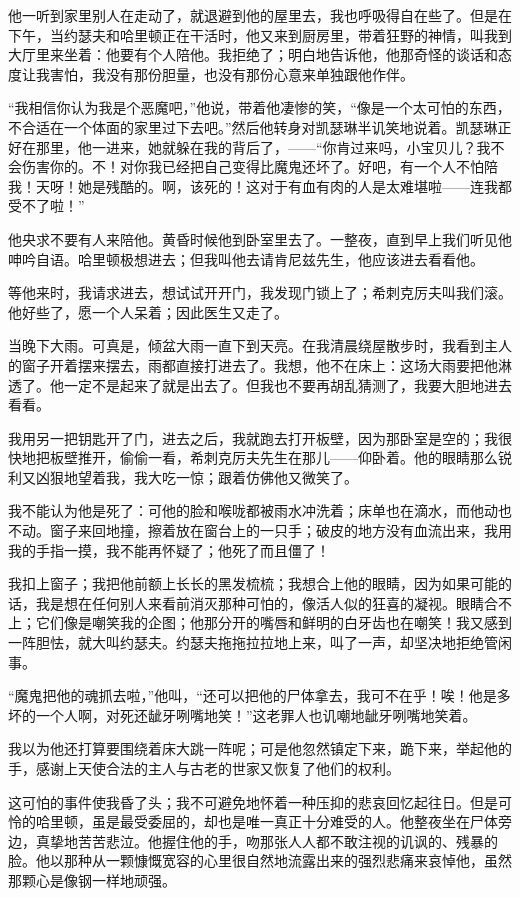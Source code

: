 \par 他一听到家里别人在走动了，就退避到他的屋里去，我也呼吸得自在些了。但是在下午，当约瑟夫和哈里顿正在干活时，他又来到厨房里，带着狂野的神情，叫我到大厅里来坐着：他要有个人陪他。我拒绝了；明白地告诉他，他那奇怪的谈话和态度让我害怕，我没有那份胆量，也没有那份心意来单独跟他作伴。
\par “我相信你认为我是个恶魔吧，”他说，带着他凄惨的笑，“像是一个太可怕的东西，不合适在一个体面的家里过下去吧。”然后他转身对凯瑟琳半讥笑地说着。凯瑟琳正好在那里，他一进来，她就躲在我的背后了，——“你肯过来吗，小宝贝儿？我不会伤害你的。不！对你我已经把自己变得比魔鬼还坏了。好吧，有一个人不怕陪我！天呀！她是残酷的。啊，该死的！这对于有血有肉的人是太难堪啦——连我都受不了啦！”
\par 他央求不要有人来陪他。黄昏时候他到卧室里去了。一整夜，直到早上我们听见他呻吟自语。哈里顿极想进去；但我叫他去请肯尼兹先生，他应该进去看看他。
\par 等他来时，我请求进去，想试试开开门，我发现门锁上了；希刺克厉夫叫我们滚。他好些了，愿一个人呆着；因此医生又走了。
\par 当晚下大雨。可真是，倾盆大雨一直下到天亮。在我清晨绕屋散步时，我看到主人的窗子开着摆来摆去，雨都直接打进去了。我想，他不在床上：这场大雨要把他淋透了。他一定不是起来了就是出去了。但我也不要再胡乱猜测了，我要大胆地进去看看。
\par 我用另一把钥匙开了门，进去之后，我就跑去打开板壁，因为那卧室是空的；我很快地把板壁推开，偷偷一看，希刺克厉夫先生在那儿——仰卧着。他的眼睛那么锐利又凶狠地望着我，我大吃一惊；跟着仿佛他又微笑了。
\par 我不能认为他是死了：可他的脸和喉咙都被雨水冲洗着；床单也在滴水，而他动也不动。窗子来回地撞，擦着放在窗台上的一只手；破皮的地方没有血流出来，我用我的手指一摸，我不能再怀疑了；他死了而且僵了！
\par 我扣上窗子；我把他前额上长长的黑发梳梳；我想合上他的眼睛，因为如果可能的话，我是想在任何别人来看前消灭那种可怕的，像活人似的狂喜的凝视。眼睛合不上；它们像是嘲笑我的企图；他那分开的嘴唇和鲜明的白牙齿也在嘲笑！我又感到一阵胆怯，就大叫约瑟夫。约瑟夫拖拖拉拉地上来，叫了一声，却坚决地拒绝管闲事。
\par “魔鬼把他的魂抓去啦，”他叫，“还可以把他的尸体拿去，我可不在乎！唉！他是多坏的一个人啊，对死还龇牙咧嘴地笑！”这老罪人也讥嘲地龇牙咧嘴地笑着。
\par 我以为他还打算要围绕着床大跳一阵呢；可是他忽然镇定下来，跪下来，举起他的手，感谢上天使合法的主人与古老的世家又恢复了他们的权利。
\par 这可怕的事件使我昏了头；我不可避免地怀着一种压抑的悲哀回忆起往日。但是可怜的哈里顿，虽是最受委屈的，却也是唯一真正十分难受的人。他整夜坐在尸体旁边，真挚地苦苦悲泣。他握住他的手，吻那张人人都不敢注视的讥讽的、残暴的脸。他以那种从一颗慷慨宽容的心里很自然地流露出来的强烈悲痛来哀悼他，虽然那颗心是像钢一样地顽强。
